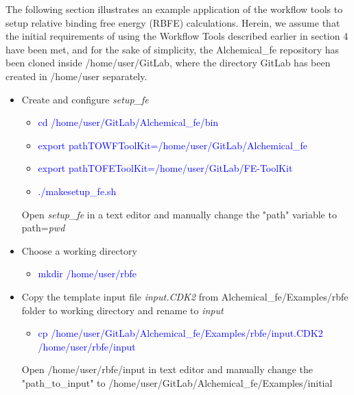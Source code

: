 \documentclass[11pt,letterpaper,titlepage]{article}
\begin{document}
The following section illustrates an example application of the workflow tools to setup 
relative binding free energy (RBFE) calculations. Herein, we assume that the
initial requirements of using the Workflow Tools described earlier in section 4 have been met, and
for the sake of simplicity, the Alchemical\_fe repository has been cloned inside /home/user/GitLab, where
the directory GitLab has been created in /home/user separately. 


\begin{itemize}
	\item Create and configure \textit{setup\_fe}\newline
		\begin{itemize}
			\setlength{\itemindent}{3em}

			\item[] \textcolor{blue}{cd /home/user/GitLab/Alchemical\_fe/bin} \\
			\item[] \textcolor{blue}{export pathTOWFToolKit=/home/user/GitLab/Alchemical\_fe} \\
			\item[] \textcolor{blue}{export pathTOFEToolKit=/home/user/GitLab/FE-ToolKit} \\
			\item[] \textcolor{blue}{./makesetup\_fe.sh} \\
		\end{itemize}
		Open \textit{setup\_fe} in a text editor and manually change the "path" variable to
		path=\textit{\textasciigrave pwd\textasciigrave} \\


	\item Choose a working directory
		\begin{itemize}
			\setlength{\itemindent}{3em}

			\item[] \textcolor{blue}{mkdir /home/user/rbfe} \\
		\end{itemize}


	\item Copy the template input file \textit{input.CDK2} from Alchemical\_fe/Examples/rbfe folder to working directory and rename to \textit{input}
		\begin{itemize}
			\setlength{\itemindent}{3em}

			\item[] \textcolor{blue}{cp /home/user/GitLab/Alchemical\_fe/Examples/rbfe/input.CDK2 /home/user/rbfe/input} \\
		\end{itemize}
		Open /home/user/rbfe/input in text editor and manually change the "path\_to\_input" to /home/user/GitLab/Alchemical\_fe/Examples/initial


\end{itemize}
\end{document}
